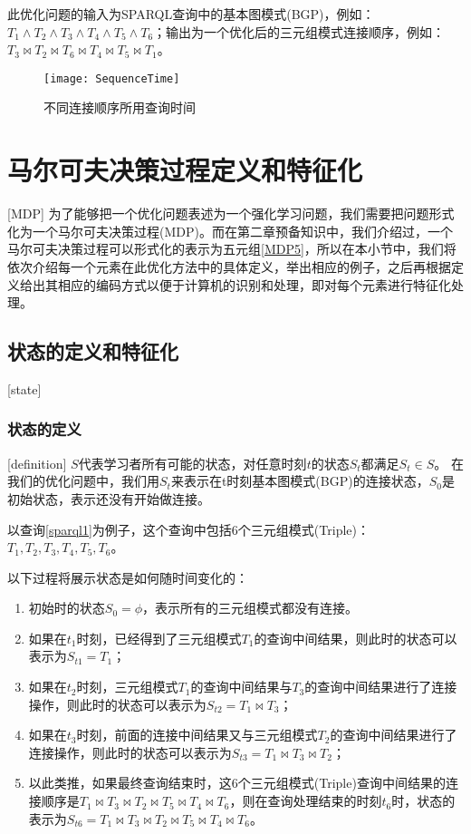 此优化问题的输入为SPARQL查询中的基本图模式(BGP)，例如：$T_1\wedge T_2\wedge T_3\wedge T_4\wedge T_5\wedge T_6$；输出为一个优化后的三元组模式连接顺序，例如：$T_3 \Join T_2 \Join T_6 \Join T_4 \Join T_5 \Join T_1$。
\begin{figure}[h]
    \centering
    \texttt{[image: SequenceTime]}
    \caption{不同连接顺序所用查询时间}
    \label{SequenceTime}
\end{figure}

\section{马尔可夫决策过程定义和特征化}[MDP]
为了能够把一个优化问题表述为一个强化学习问题，我们需要把问题形式化为一个马尔可夫决策过程(MDP)。而在第二章预备知识中，我们介绍过，一个马尔可夫决策过程可以形式化的表示为五元组\ref{MDP5}，所以在本小节中，我们将依次介绍每一个元素在此优化方法中的具体定义，举出相应的例子，之后再根据定义给出其相应的编码方式以便于计算机的识别和处理，即对每个元素进行特征化处理。
\subsection{状态的定义和特征化}[state]
\subsubsection{状态的定义}[definition]
$S$代表学习者所有可能的状态，对任意时刻$t$的状态$S_t$都满足$S_t \in S$。
在我们的优化问题中，我们用$S_t$来表示在t时刻基本图模式(BGP)的连接状态，$S_0$是初始状态，表示还没有开始做连接。

以查询\ref{sparql1}为例子，这个查询中包括6个三元组模式(Triple)：$T_1, T_2, T_3, T_4, T_5, T_6$。

以下过程将展示状态是如何随时间变化的：
\begin{enumerate}
    \item 初始时的状态$S_0=\phi$，表示所有的三元组模式都没有连接。
    \item 如果在$t_1$时刻，已经得到了三元组模式$T_1$的查询中间结果，则此时的状态可以表示为$S_{t1} = T_1$； 
    \item 如果在$t_2$时刻，三元组模式$T_1$的查询中间结果与$T_3$的查询中间结果进行了连接操作，则此时的状态可以表示为$S_{t2} = T_1 \Join T_3$；
    \item 如果在$t_3$时刻，前面的连接中间结果又与三元组模式$T_2$的查询中间结果进行了连接操作，则此时的状态可以表示为$S_{t3} = T_1 \Join T_3 \Join T_2$；
    \item 以此类推，如果最终查询结束时，这6个三元组模式(Triple)查询中间结果的连接顺序是$T_1 \Join T_3 \Join T_2 \Join T_5 \Join T_4 \Join T_6$，则在查询处理结束的时刻$t_6$时，状态的表示为$S_{t6} = T_1 \Join T_3 \Join T_2 \Join T_5 \Join T_4 \Join T_6$。
\end{enumerate}

